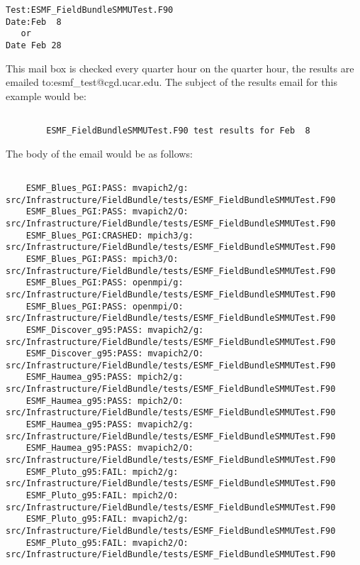 \begin{verbatim}
Test:ESMF_FieldBundleSMMUTest.F90
Date:Feb  8
   or
Date Feb 28
\end{verbatim}

This mail box is checked every quarter hour on the quarter hour, the results are emailed to:esmf\_test@cgd.ucar.edu.
The subject of the results email for this example would be:
\begin{verbatim}

        ESMF_FieldBundleSMMUTest.F90 test results for Feb  8

\end{verbatim}

The body of the email would be as follows:

\begin{verbatim}

	ESMF_Blues_PGI:PASS: mvapich2/g: src/Infrastructure/FieldBundle/tests/ESMF_FieldBundleSMMUTest.F90
	ESMF_Blues_PGI:PASS: mvapich2/O: src/Infrastructure/FieldBundle/tests/ESMF_FieldBundleSMMUTest.F90
	ESMF_Blues_PGI:CRASHED: mpich3/g: src/Infrastructure/FieldBundle/tests/ESMF_FieldBundleSMMUTest.F90
	ESMF_Blues_PGI:PASS: mpich3/O: src/Infrastructure/FieldBundle/tests/ESMF_FieldBundleSMMUTest.F90
	ESMF_Blues_PGI:PASS: openmpi/g: src/Infrastructure/FieldBundle/tests/ESMF_FieldBundleSMMUTest.F90
	ESMF_Blues_PGI:PASS: openmpi/O: src/Infrastructure/FieldBundle/tests/ESMF_FieldBundleSMMUTest.F90
	ESMF_Discover_g95:PASS: mvapich2/g: src/Infrastructure/FieldBundle/tests/ESMF_FieldBundleSMMUTest.F90
	ESMF_Discover_g95:PASS: mvapich2/O: src/Infrastructure/FieldBundle/tests/ESMF_FieldBundleSMMUTest.F90
	ESMF_Haumea_g95:PASS: mpich2/g: src/Infrastructure/FieldBundle/tests/ESMF_FieldBundleSMMUTest.F90
	ESMF_Haumea_g95:PASS: mpich2/O: src/Infrastructure/FieldBundle/tests/ESMF_FieldBundleSMMUTest.F90
	ESMF_Haumea_g95:PASS: mvapich2/g: src/Infrastructure/FieldBundle/tests/ESMF_FieldBundleSMMUTest.F90
	ESMF_Haumea_g95:PASS: mvapich2/O: src/Infrastructure/FieldBundle/tests/ESMF_FieldBundleSMMUTest.F90
	ESMF_Pluto_g95:FAIL: mpich2/g: src/Infrastructure/FieldBundle/tests/ESMF_FieldBundleSMMUTest.F90
	ESMF_Pluto_g95:FAIL: mpich2/O: src/Infrastructure/FieldBundle/tests/ESMF_FieldBundleSMMUTest.F90
	ESMF_Pluto_g95:FAIL: mvapich2/g: src/Infrastructure/FieldBundle/tests/ESMF_FieldBundleSMMUTest.F90
	ESMF_Pluto_g95:FAIL: mvapich2/O: src/Infrastructure/FieldBundle/tests/ESMF_FieldBundleSMMUTest.F90

\end{verbatim}

